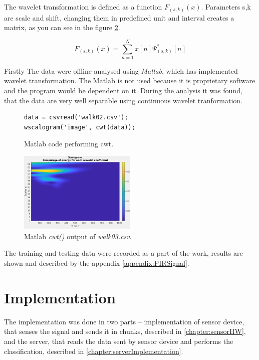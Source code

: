 The wavelet transformation is defined as a function $F_{(s,k)}(x)$. Parameters s,k are scale and shift, changing
them in predefined unit and interval creates a matrix, as you can see in the figure \ref{fig:walk03}.

\begin{equation}
F_{(s,k)}(x) = \sum_{n=1}^{N} x[n] \Psi_{(s,k)}^{*}[n]
\end{equation}

Firstly The data were offline analysed using {\it Matlab}, which has implemented wavelet transformation.
The Matlab is not used because it is proprietary software and the program would be dependent on it.
During the analysis it was found, that the data are very well separable using continuous wavelet tranformation.

\begin{figure}[h!]
\begin{lstlisting}[style=matlab]
data = csvread('walk02.csv');
wscalogram('image', cwt(data));
\end{lstlisting}
\caption{Matlab code performing cwt.\label{list:cwtmatlab}}
\end{figure}

\begin{figure}[h!]
\begin{center}
\includegraphics[width=0.5\textwidth]{img/walk03.png}
\caption{Matlab {\it cwt()} output of {\it walk03.csv}.\label{fig:walk03}}
\end{center}
\end{figure}


The training and testing data were recorded as a part of the work, results are
shown and described by the appendix \ref{appendix:PIRSignal}.




\chapter{Implementation}

The implementation was done in two parts -- implementation of sensor device, that senses
the signal and sends it in chunks, described in \ref{chapter:sensorHW}, and the server,
that reads the data sent by sensor device and performs the classification, described in
\ref{chapter:serverImplementation}.

